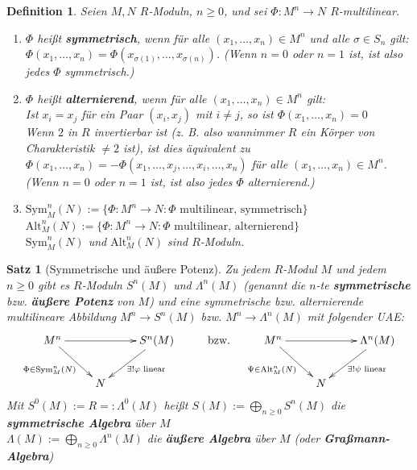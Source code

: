 \documentclass[a4paper,12pt]{scrbook}
\theoremstyle{break}
\newtheorem{Satz}{Satz}
\newtheorem{Def}{Definition}[chapter]
\theoremstyle{nonumberbreak}
\theoremstyle{nonumberplain}
\newcommand{\emp}[1]{\textbf{\emph{#1}}}
\begin{document}
\begin{Def} Seien $M,N$ $R$-Moduln, $n \geq 0$, und sei $\Phi: M^n \rightarrow N$ $R$-multilinear.
  \begin{enumerate}
  \item[a)] $\Phi$ heißt \emp{symmetrisch}, wenn für alle $(x_1, \dots, x_n) \in M^n$ und alle $\sigma \in S_n$ gilt:\\
    $\Phi(x_1, \dots , x_n) = \Phi( x_{\sigma(1)},  \dots, x_{\sigma(n)})$.
    (Wenn $n = 0$ oder $n = 1$ ist, ist also jedes $\Phi$ symmetrisch.)
  \item[b)] $\Phi$ heißt \emp{alternierend}, wenn für alle $(x_1, \dots, x_n ) \in M^n$ gilt:\\
    Ist $x_i = x_j$ für ein Paar $(x_i,x_j)$ mit $i \neq j$, so ist $\Phi(x_1, \dots , x_n) = 0$\\
    Wenn $2$ in $R$ invertierbar ist (z. B. also wannimmer $R$ ein Körper von Charakteristik $\neq 2$
    ist), ist dies äquivalent zu $\Phi(x_1, \ldots, x_n) = -\Phi(x_1, \ldots, x_j, \ldots, x_i, \ldots, x_n)$
    für alle $(x_1, \dots, x_n ) \in M^n$.
    (Wenn $n = 0$ oder $n = 1$ ist, ist also jedes $\Phi$ alternierend.)
  \item[c)] $\mbox{Sym}^n_M(N) := \{ \Phi: M^n \rightarrow N: \Phi \text{ multilinear, symmetrisch}\}$\\
    $\mbox{Alt}^n_M(N) := \{ \Phi: M^n \rightarrow N: \Phi \text{ multilinear, alternierend}\}$\\
    $\mbox{Sym}^n_M(N)$ und  $\mbox{Alt}^n_M(N)$ sind $R$-Moduln.
  \end{enumerate}
\end{Def}

\begin{Satz}[Symmetrische und äußere Potenz]
Zu jedem $R$-Modul $M$ und jedem $n \geq 0$ gibt es $R$-Moduln $S^n(M)$ und $\Lambda^n(M)$ (genannt die $n$-te \emp{symmetrische} bzw. \emp{äußere Potenz} von $M$)
  und eine symmetrische bzw. alternierende multilineare Abbildung $M^n \rightarrow S^n(M)$ bzw.  $M^n \rightarrow \Lambda ^n(M)$ mit folgender UAE:
$$
\xymatrix{
M^n \ar[rr] \ar[rd]_{\Phi\in \textrm{Sym}_M^n(N)}  &     &  S^n(M) \ar[dl]^{\exists!\varphi\textrm{\ linear}}  &
\text{bzw.} &
M^n \ar[rr] \ar[rd]_{\Psi\in \textrm{Alt}_M^n(N)}  &     &  \Lambda^n(M) \ar[dl]^{\exists!\psi\textrm{\ linear}}  \\
  &  N  & & &
  &  N  & \\
}
$$
Mit $S^0(M) := R =: \Lambda^0(M)$ heißt $S(M):= \bigoplus_{n\geq 0} S^n(M)$ die \emp{symmetrische Algebra} über $M$\\
$\Lambda (M) := \bigoplus_{n\geq 0} \Lambda^n(M)$ die \emp{äußere Algebra} über $M$ (oder \emp{Graßmann-Algebra})
\end{Satz}
 
\end{document}
